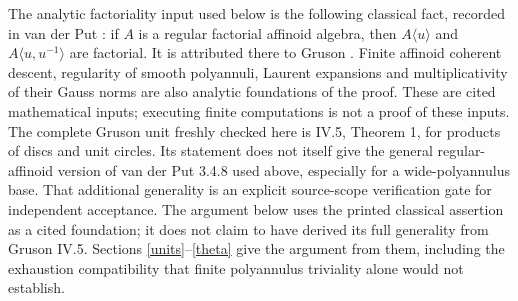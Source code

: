 \documentclass[11pt]{article}
\theoremstyle{remark}\newtheorem{remark}[theorem]{Remark}
\begin{document}
The analytic factoriality input used below is the following classical
fact, recorded in van der Put \cite[3.4.8]{vdP}: if $A$ is a regular
factorial affinoid algebra, then $A\langle u\rangle$ and
$A\langle u,u^{-1}\rangle$ are factorial. It is attributed there to Gruson
\cite{Gruson}. Finite affinoid coherent descent, regularity of smooth
polyannuli, Laurent expansions and multiplicativity of their Gauss norms
are also analytic foundations of the proof. These are cited mathematical
inputs; executing finite computations is not a proof of these inputs.
The complete Gruson unit freshly checked here is IV.5, Theorem 1,
for products of discs and unit circles. Its statement does not itself
give the general regular-affinoid version of van der Put 3.4.8 used
above, especially for a wide-polyannulus base. That additional
generality is an explicit source-scope verification gate for independent
acceptance. The argument below uses the printed classical assertion
as a cited foundation; it does not claim to have derived its full
generality from Gruson IV.5.
Sections \ref{units}--\ref{theta} give the argument from them, including
the exhaustion compatibility that finite polyannulus triviality alone
would not establish.
\end{document}
